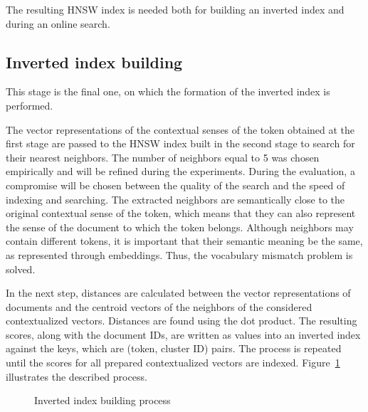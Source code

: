 \documentclass[
    twocolumn,
]{template/ceurart}
\begin{document}
    The resulting HNSW index is needed both for building an inverted index and during an online search.

    \subsection{Inverted index building}
    This stage is the final one, on which the formation of the inverted index is performed.

    The vector representations of the contextual senses of the token obtained at the first stage
    are passed to the HNSW index built in the second stage to search for their nearest neighbors.
    The number of neighbors equal to 5 was chosen empirically and will be refined during the experiments.
    During the evaluation, a compromise will be chosen between the quality of the search and
    the speed of indexing and searching.
    The extracted neighbors are semantically close to the original contextual sense of the token,
    which means that they can also represent the sense of the document to which the token belongs.
    Although neighbors may contain different tokens, it is important that their semantic meaning be the same,
    as represented through embeddings.
    Thus, the vocabulary mismatch problem is solved.

    In the next step, distances are calculated between the vector representations of documents and
    the centroid vectors of the neighbors of the considered contextualized vectors.
    Distances are found using the dot product.
    The resulting scores, along with the document IDs, are written as values into an inverted index against the keys,
    which are (token, cluster ID) pairs.
    The process is repeated until the scores for all prepared contextualized vectors are indexed.
    Figure~\ref{fig:invertedIndexBuilding} illustrates the described process.
    \begin{figure}
        \centering
        
        \caption{Inverted index building process}
        \label{fig:invertedIndexBuilding}
    \end{figure}

    
\end{document}
